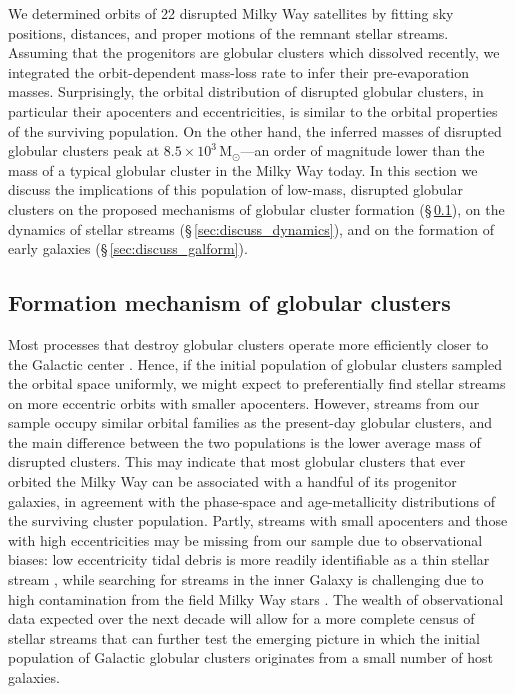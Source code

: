 \documentclass[twocolumn]{aastex63}
\newcommand{\msun}{\ensuremath{\textrm{M}_\odot}}
\begin{document}
We determined orbits of 22 disrupted Milky Way satellites by fitting sky positions, distances, and proper motions of the remnant stellar streams.
Assuming that the progenitors are globular clusters which dissolved recently, we integrated the orbit-dependent mass-loss rate to infer their pre-evaporation masses.
Surprisingly, the orbital distribution of disrupted globular clusters, in particular their apocenters and eccentricities, is similar to the orbital properties of the surviving population.
On the other hand, the inferred masses of disrupted globular clusters peak at $8.5\times10^3\,\msun$---an order of magnitude lower than the mass of a typical globular cluster in the Milky Way today.
In this section we discuss the implications of this population of low-mass, disrupted globular clusters on the proposed mechanisms of globular cluster formation (\S\,\ref{sec:discuss_gcform}), on the dynamics of stellar streams (\S\,\ref{sec:discuss_dynamics}), and on the formation of early galaxies (\S\,\ref{sec:discuss_galform}).

\subsection{Formation mechanism of globular clusters}
\label{sec:discuss_gcform}
Most processes that destroy globular clusters operate more efficiently closer to the Galactic center \citep[e.g.,][]{gnedin:1997}.
Hence, if the initial population of globular clusters sampled the orbital space uniformly, we might expect to preferentially find stellar streams on more eccentric orbits with smaller apocenters.
However, streams from our sample occupy similar orbital families as the present-day globular clusters, and the main difference between the two populations is the lower average mass of disrupted clusters.
This may indicate that most globular clusters that ever orbited the Milky Way can be associated with a handful of its progenitor galaxies, in agreement with the phase-space \citep{massari:2019} and age-metallicity \citep{kruijssen19e,kruijssen20} distributions of the surviving cluster population.
Partly, streams with small apocenters and those with high eccentricities may be missing from our sample due to observational biases: low eccentricity tidal debris is more readily identifiable as a thin stellar stream \citep{hendel:2015}, while searching for streams in the inner Galaxy is challenging due to high contamination from the field Milky Way stars \citep[e.g.,][]{ibata:2019}.
The wealth of observational data expected over the next decade will allow for a more complete census of stellar streams that can further test the emerging picture in which the initial population of Galactic globular clusters originates from a small number of host galaxies.
\end{document}
